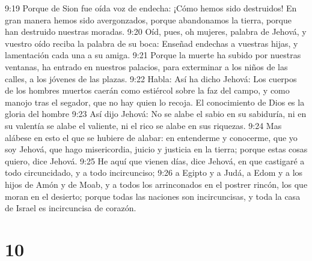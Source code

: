 9:19 Porque de Sion fue oída voz de endecha: ¡Cómo hemos sido destruidos! En gran manera hemos sido avergonzados, porque abandonamos la tierra, porque han destruido nuestras moradas.  
9:20 Oíd, pues, oh mujeres, palabra de Jehová, y vuestro oído reciba la palabra de su boca: Enseñad endechas a vuestras hijas, y lamentación cada una a su amiga.  
9:21 Porque la muerte ha subido por nuestras ventanas, ha entrado en nuestros palacios, para exterminar a los niños de las calles, a los jóvenes de las plazas.  
9:22 Habla: Así ha dicho Jehová: Los cuerpos de los hombres muertos caerán como estiércol sobre la faz del campo, y como manojo tras el segador, que no hay quien lo recoja.  
El conocimiento de Dios es la gloria del hombre  
9:23 Así dijo Jehová: No se alabe el sabio en su sabiduría, ni en su valentía se alabe el valiente, ni el rico se alabe en sus riquezas.  
9:24 Mas alábese en esto el que se hubiere de alabar: en entenderme y conocerme, que yo soy Jehová, que hago misericordia, juicio y justicia en la tierra; porque estas cosas quiero, dice Jehová.  
9:25 He aquí que vienen días, dice Jehová, en que castigaré a todo circuncidado, y a todo incircunciso;  
9:26 a Egipto y a Judá, a Edom y a los hijos de Amón y de Moab, y a todos los arrinconados en el postrer rincón, los que moran en el desierto; porque todas las naciones son incircuncisas, y toda la casa de Israel es incircuncisa de corazón.  

\chapter{10}

